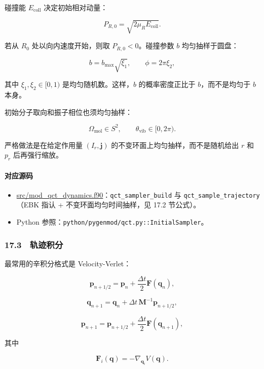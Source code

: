 \documentclass[
]{ctexbook}
\providecommand{\tightlist}{%
  \setlength{\itemsep}{0pt}\setlength{\parskip}{0pt}}
\begin{document}
碰撞能 \(E_{\mathrm{coll}}\) 决定初始相对动量：

\[
P_{R,0}
=
\sqrt{2\mu_R E_{\mathrm{coll}}}.
\]

若从 \(R_0\) 处以向内速度开始，则取 \(P_{R,0}<0\)。碰撞参数 \(b\)
均匀抽样于圆盘：

\[
b=b_{\max}\sqrt{\xi_1},
\qquad
\phi=2\pi\xi_2,
\]

其中 \(\xi_1,\xi_2\in[0,1)\) 是均匀随机数。这样，\(b\) 的概率密度正比于
\(b\)，而不是均匀于 \(b\) 本身。

初始分子取向和振子相位也须均匀抽样：

\[
\Omega_{\mathrm{mol}}\in S^2,
\qquad
\theta_{\mathrm{vib}}\in[0,2\pi).
\]

严格做法是在给定作用量 \((I_r,\mathbf j)\)
的不变环面上均匀抽样，而不是随机给出 \(r\) 和 \(p_r\) 后再强行缩放。

\hypertarget{ux5bf9ux5e94ux6e90ux7801-74}{%
\paragraph{对应源码}\label{ux5bf9ux5e94ux6e90ux7801-74}}

\begin{itemize}
\tightlist
\item
  \href{https://github.com/l1Ha/QuantumGeneralModule/blob/main/src/mod_qct_dynamics.f90}{src/mod\_qct\_dynamics.f90}：\texttt{qct\_sampler\_build}
  与 \texttt{qct\_sample\_trajectory}（EBK 指认 +
  不变环面均匀时间抽样，见 17.2 节公式）。
\item
  Python 参照：\texttt{python/pygenmod/qct.py::InitialSampler}。
\end{itemize}

\hypertarget{ux8f68ux8ff9ux79efux5206}{%
\subsubsection{17.3　轨迹积分}\label{ux8f68ux8ff9ux79efux5206}}

最常用的辛积分格式是 Velocity-Verlet：

\[
\mathbf p_{n+1/2}
=
\mathbf p_n+\frac{\Delta t}{2}\mathbf F(\mathbf q_n),
\]

\[
\mathbf q_{n+1}
=
\mathbf q_n+\Delta t\,\mathbf M^{-1}\mathbf p_{n+1/2},
\]

\[
\mathbf p_{n+1}
=
\mathbf p_{n+1/2}+\frac{\Delta t}{2}\mathbf F(\mathbf q_{n+1}),
\]

其中

\[
\mathbf F_i(\mathbf q)=-\nabla_{\mathbf q_i}V(\mathbf q).
\]
\end{document}

